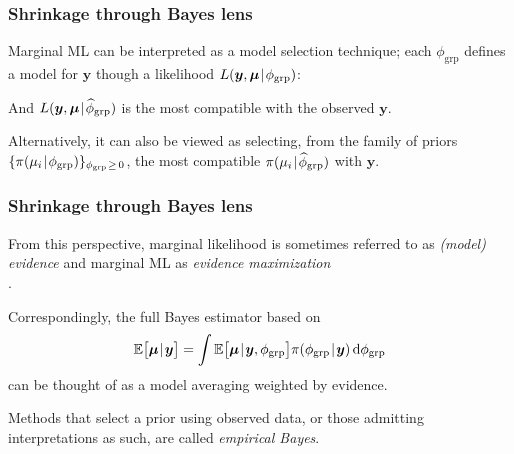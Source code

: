 \documentclass[18pt]{beamer}
\newcommand{\defineTightSpacing}{%
	\setlength{\abovedisplayskip}{.25\baselineskip}%
	\setlength{\belowdisplayskip}{.25\baselineskip}%
}
\renewcommand{\textsc}[1]{{\small \MakeUppercase{#1}}}
\newcommand{\given}{\thinnerspace | \thinnerspace}
\newcommand{\diff}{\operatorname{\mathrm{d}}\!{}}
\newcommand{\thinnerspace}{\mskip.5\thinmuskip}
\newcommand{\expectation}{\mathbb{E}}
\newcommand{\density}{\pi}
\newcommand{\likelihood}{L}
\newcommand{\by}{\bm{y}}
\newcommand{\bmu}{\bm{\mu}}
\begin{document}
\begin{frame}
\frametitle{Shrinkage through Bayes lens}
Marginal {\small ML} can be interpreted as a model selection technique;
each $\phi_{\mathrm{grp}}$ defines a model for $\by$ though a likelihood $\likelihood(\by, \bmu \given \phi_{\mathrm{grp}})$:
\vspace*{-.4\baselineskip}
\begin{figure} 
\end{figure}
\vspace*{-.7\baselineskip}

\pause
And $\likelihood(\by, \bmu \given \widehat{\phi}_{\mathrm{grp}})$ is the most compatible with the observed $\by$.

\pause
\smallskip
Alternatively, it can also be viewed as selecting, from the family of priors $\{ \density(\mu_i \given \phi_{\mathrm{grp}}) \}_{ \phi_{\mathrm{grp}} \thinnerspace \geq \, 0 } $, the most compatible $\density(\mu_i \given \widehat{\phi}_{\mathrm{grp}})$ with $\by$.
\end{frame}

\begin{frame}
\frametitle{Shrinkage through Bayes lens}

From this perspective, marginal likelihood is sometimes referred to as \textit{(model) evidence} and marginal \textsc{ML} as \textit{evidence maximization}\\
\hfill \citep{mackay1992bayesian_model_comparison}.%

\pause
Correspondingly, the full Bayes estimator based on
\begin{equation*} \defineTightSpacing%
\expectation\big[
	\bmu \given \by
\big]
	= \int \expectation\big[
		\bmu \given \by, \phi_{\mathrm{grp}}
	\big] \density(\phi_{\mathrm{grp}} \given \by) \diff \phi_{\mathrm{grp}}
\end{equation*}
can be thought of as a model averaging weighted by evidence.

\pause
\smallskip
Methods that select a prior using observed data, or those admitting interpretations as such, are called \textit{empirical Bayes}.
\end{frame}
\end{document}
